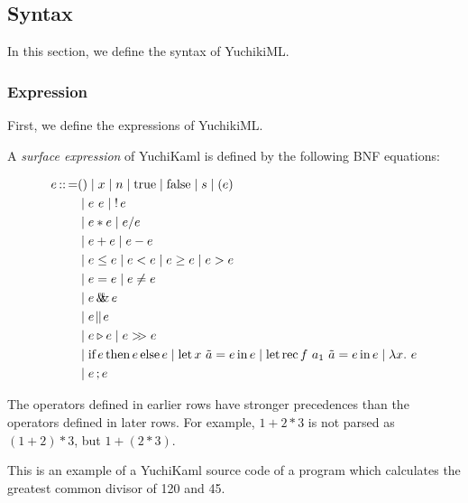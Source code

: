 
\subsection{Syntax}
In this section, we define the syntax of YuchikiML.

\subsubsection{Expression}

First, we define the expressions of YuchikiML.

\begin{definition}
    A \emph{surface expression} of YuchiKaml is defined by the following BNF equations:

    \begin{align*}
        e \defeq    & () \mid x \mid n \mid \trueToken \mid \falseToken \mid s \mid (e)\\
                    &\mid e\ e \mid \logNot e\\
                    &\mid e * e \mid e / e\\
                    &\mid e + e \mid e - e\\
                    &\mid e \leq e \mid e < e \mid e \geq e \mid e > e\\
                    &\mid e = e \mid e \not= e\\
                    &\mid e \logAnd e\\
                    &\mid e \logOr e\\
                    &\mid e \triangleright e \mid e \composition e\\
                    &\mid \ifStructure{e}{e}{e} \mid \letStructure{x\ \tilde{a}}{e}{e} \mid \letRecStructure{f}{a_1\ \tilde{a}}{e}{e} \mid \abs{x}{e}\\
                    &\mid e\opCol{}e
    \end{align*}
\end{definition}

The operators defined in earlier rows have stronger precedences than the operators defined in later rows.
For example, $1 + 2 * 3$ is not parsed as $(1 + 2) * 3$, but $1 + ( 2 * 3)$.

\begin{example}[GCD]
    This is an example of a YuchiKaml source code of a program which calculates the greatest common divisor of 120 and 45.

    
\end{example}


